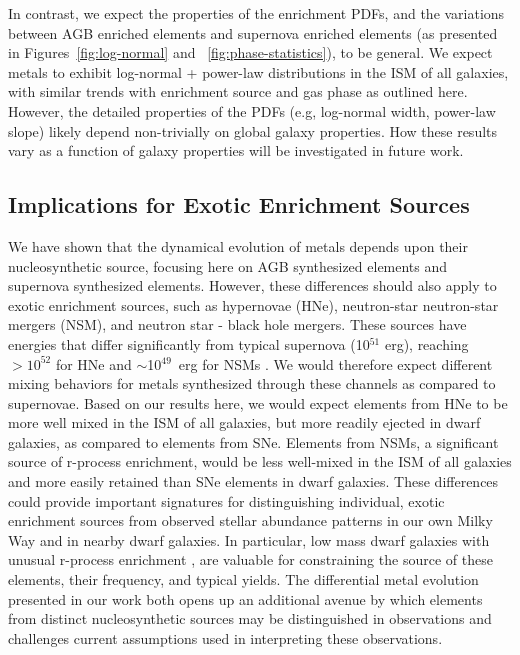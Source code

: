 \documentclass[twocolumn]{aastex61}
\begin{document}
In contrast, we expect the properties of the enrichment PDFs, and the variations between AGB enriched elements and supernova enriched elements (as presented in Figures~\ref{fig:log-normal} and ~\ref{fig:phase-statistics}), to be general. We expect metals to exhibit log-normal + power-law distributions in the ISM of all galaxies, with similar trends with enrichment source and gas phase as outlined here. However, the detailed properties of the PDFs (e.g, log-normal width, power-law slope) likely depend non-trivially on global galaxy properties. How these results vary as a function of galaxy properties will be investigated in future work.



%
%
\subsection{Implications for Exotic Enrichment Sources}
\label{sec:exotic enrichment}
We have shown that the dynamical evolution of metals depends upon their nucleosynthetic source, focusing here on AGB synthesized elements and supernova synthesized elements. However, these differences should also apply to exotic enrichment sources, such as hypernovae (HNe), neutron-star neutron-star mergers (NSM), and neutron star - black hole mergers. These sources have energies that differ significantly from typical supernova (10$^{51}$ erg), reaching $> 10^{52}$ for HNe \citep{Nomoto2004} and $\sim$10$^{49}$~erg for NSMs \citep{Goriely2011}. We would therefore expect different mixing behaviors for metals synthesized through these channels as compared to supernovae. Based on our results here, we would expect elements from HNe to be more well mixed in the ISM of all galaxies, but more readily ejected in dwarf galaxies, as compared to elements from SNe. Elements from NSMs, a significant source of r-process enrichment, would be less well-mixed in the ISM of all galaxies and more easily retained than SNe elements in dwarf galaxies. These differences could provide important signatures for distinguishing individual, exotic enrichment sources from observed stellar abundance patterns in our own Milky Way and in nearby dwarf galaxies. In particular, low mass dwarf galaxies with unusual r-process enrichment \citep[e.g.][]{Ji2015}, are valuable for constraining the source of these elements, their frequency, and typical yields. The differential metal evolution presented in our work both opens up an additional avenue by which elements from distinct nucleosynthetic sources may be distinguished in observations and challenges current assumptions used in interpreting these observations.
\end{document}

